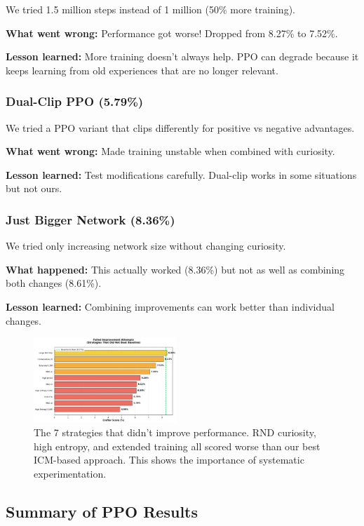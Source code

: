 \documentclass[conference]{IEEEtran}
\begin{document}
We tried 1.5 million steps instead of 1 million (50\% more training).

\textbf{What went wrong:} Performance got worse! Dropped from 8.27\% to 7.52\%.

\textbf{Lesson learned:} More training doesn't always help. PPO can degrade because it keeps learning from old experiences that are no longer relevant.

\subsubsection{Dual-Clip PPO (5.79\%)}

We tried a PPO variant that clips differently for positive vs negative advantages.

\textbf{What went wrong:} Made training unstable when combined with curiosity.

\textbf{Lesson learned:} Test modifications carefully. Dual-clip works in some situations but not ours.

\subsubsection{Just Bigger Network (8.36\%)}

We tried only increasing network size without changing curiosity.

\textbf{What happened:} This actually worked (8.36\%) but not as well as combining both changes (8.61\%).

\textbf{Lesson learned:} Combining improvements can work better than individual changes.

\begin{figure}[h!]
\centering
\includegraphics[width=0.48\textwidth]{fig4_failed_attempts.pdf}
\caption{The 7 strategies that didn't improve performance. RND curiosity, high entropy, and extended training all scored worse than our best ICM-based approach. This shows the importance of systematic experimentation.}
\label{fig:failed}
\end{figure}

\subsection{Summary of PPO Results}
\end{document}
